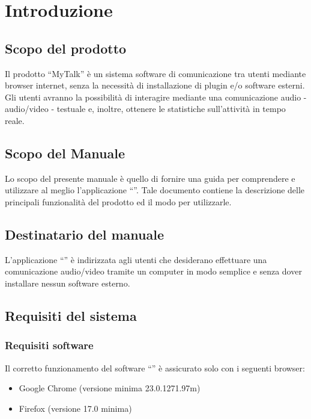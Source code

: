 


\setcounter{page}{1}
\pagestyle{normal}

\section{Introduzione}
\subsection{Scopo del prodotto}
Il prodotto ``MyTalk'' è un sistema software di comunicazione tra utenti mediante browser internet, senza la necessità di installazione di plugin e/o software esterni. Gli utenti avranno la possibilità di interagire mediante una comunicazione audio - audio/video - testuale e, inoltre, ottenere le statistiche sull'attività in tempo reale.

\subsection{Scopo del Manuale}
Lo scopo del presente manuale è quello di fornire una guida per comprendere e utilizzare al meglio l'applicazione ``\caName''.
Tale documento contiene la descrizione delle principali funzionalità del prodotto ed il modo
per utilizzarle.

\subsection{Destinatario del manuale}
L'applicazione  ``\caName'' è indirizzata agli utenti che desiderano effettuare una comunicazione audio/video tramite un computer in modo semplice  e senza dover installare nessun software esterno.  

\subsection{Requisiti del sistema}
\subsubsection{Requisiti software}
Il corretto funzionamento del software  ``\caName'' è assicurato solo con i seguenti browser:
\begin{itemize}
  \item Google Chrome (versione minima 23.0.1271.97m)
  \item Firefox (versione 17.0 minima)
\end{itemize}

